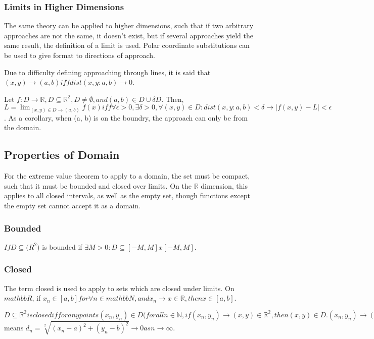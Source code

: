 \documentclass[11 pt, twoside]{article}
\begin{document}
\subsubsection{Limits in Higher Dimensions}
The same theory can be applied to higher dimensions, such that if two arbitrary approaches are not the same, it doesn't exist, but if several approaches yield the same result, the definition of a limit is used. Polar coordinate substitutions can be used to give format to directions of approach.

Due to difficulty defining approaching through lines, it is said that $(x, y) \to (a, b) iff dist(x, y: a, b) \to 0$.

Let $f: D \to \mathbb{R}, D \subseteq \mathbb{R^2}, D \neq \emptyset, and (a, b) \in D \cup \delta D.$ Then, $L = \lim_{(x, y) \in D \to (a,b)} f(x) iff \forall \epsilon > 0, \exists \delta > 0, \forall (x, y) \in D: dist(x, y: a, b) < \delta \to |f(x, y) - L| < \epsilon$. As a corollary, when (a, b) is on the boundry, the approach can only be from the domain.

\subsection{Properties of Domain}
For the extreme value theorem to apply to a domain, the set must be compact, such that it must be bounded and closed over limits. On the $\mathbb{R}$ dimension, this applies to all closed intervals, as well as the empty set, though functions except the empty set cannot accept it as a domain.

\subsubsection{Bounded}
$If D \subseteq \mathbb(R^2)$ is bounded if $\exists M > 0: D \subseteq [-M, M] x [-M, M]$.

\subsubsection{Closed}
The term closed is used to apply to sets which are closed under limits. On $mathbb{R}$, if $x_n \in [a, b] for \forall n \in mathbb{N}, and x_n \to x \in \mathbb{R}, then x \in [a, b]$.

$D \subseteq \mathbb{R^2} is closed if for any points (x_n, y_n) \in D (for all n \in \mathbb{N}, if (x_n, y_n) \to (x, y) \in \mathbb{R^2}, then (x, y) \in D. (x_n, y_n) \to (a, b) as n \to \infty$ means $d_n = \sqrt[2]{(x_n - a)^2 + (y_n - b)^2} \to 0 as n \to \infty.$
\end{document}
